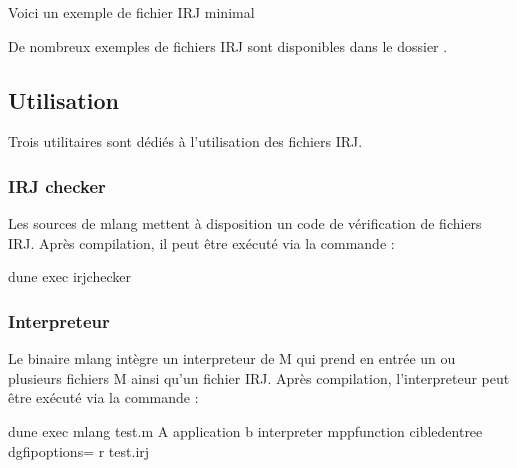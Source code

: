\documentclass[letterpaper,10pt,french]{sphinxmanual}
\begin{document}
\sphinxAtStartPar
Voici un exemple de fichier IRJ minimal

\begin{sphinxVerbatim}[commandchars=\\\{\}]
\end{sphinxVerbatim}

\sphinxAtStartPar
De nombreux exemples de fichiers IRJ sont disponibles dans le dossier .


\subsection{Utilisation}
\label{\detokenize{syntax_irj:utilisation}}
\sphinxAtStartPar
Trois utilitaires sont dédiés à l’utilisation des fichiers IRJ.


\subsubsection{IRJ checker}
\label{\detokenize{syntax_irj:irj-checker}}
\sphinxAtStartPar
Les sources de mlang mettent à disposition un code de vérification de fichiers
IRJ.
Après compilation, il peut être exécuté via la commande :

\begin{sphinxVerbatim}[commandchars=\\\{\}]
\PYGZdl{} dune exec \PYGZhy{}\PYGZhy{} irj\PYGZus{}checker
\end{sphinxVerbatim}


\subsubsection{Interpreteur}
\label{\detokenize{syntax_irj:interpreteur}}
\sphinxAtStartPar
Le binaire mlang intègre un interpreteur de M qui prend en entrée un ou
plusieurs fichiers M ainsi qu’un fichier IRJ.
Après compilation, l’interpreteur peut être exécuté via la commande :

\begin{sphinxVerbatim}[commandchars=\\\{\}]
\PYGZdl{} dune exec \PYGZhy{}\PYGZhy{} mlang test.m \PYGZhy{}A application \PYGZhy{}b interpreter \PYGZhy{}\PYGZhy{}mpp\PYGZus{}function cible\PYGZus{}dentree  \PYGZhy{}\PYGZhy{}dgfip\PYGZus{}options=\PYGZsq{}\PYGZsq{} \PYGZhy{}r test.irj
\end{sphinxVerbatim}
\end{document}
